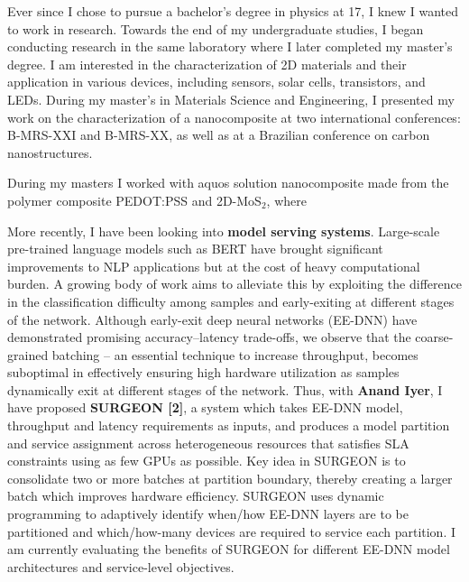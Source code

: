 \documentclass{article}
\begin{document}

Ever since I chose to pursue a bachelor's degree in physics at 17, I knew I wanted to work in research. Towards the end of my undergraduate studies, I began conducting research in the same laboratory where I later completed my master's degree. I am interested in the characterization of 2D materials and their application in various devices, including sensors, solar cells, transistors, and LEDs. During my master's in Materials Science and Engineering, I presented my work on the characterization of a nanocomposite at two international conferences: B-MRS-XXI and B-MRS-XX, as well as at a Brazilian conference on carbon nanostructures.



During my masters I worked with aquos solution nanocomposite made from the polymer composite PEDOT:PSS and 2D-MoS$_2$, where 


More recently, I have been looking into \textbf{model serving systems}. Large-scale pre-trained language models such as BERT have brought significant improvements to NLP applications but at the cost of heavy computational burden. A growing body of work aims to alleviate this by exploiting the difference in the classification difficulty among samples and early-exiting at different stages of the network. 
Although early-exit deep neural networks (EE-DNN) have demonstrated promising accuracy–latency trade-offs, we observe that the coarse-grained batching -- an essential technique to increase throughput, becomes suboptimal in effectively ensuring high hardware utilization as samples dynamically exit at different stages of the network. 
Thus, with \textbf{Anand Iyer}, I have proposed \textbf{SURGEON [2]}, a system which takes EE-DNN model, throughput and latency requirements as inputs, and produces a model partition and service assignment across heterogeneous resources that satisfies SLA constraints using as few GPUs as possible. 
Key idea in SURGEON is to consolidate two or more batches at partition boundary, thereby creating a larger batch which  improves hardware efficiency. SURGEON uses dynamic programming to adaptively identify when/how EE-DNN layers are to be partitioned and which/how-many devices are required to service each partition. I am currently evaluating the benefits of SURGEON for different EE-DNN model architectures and service-level objectives.
\end{document}
